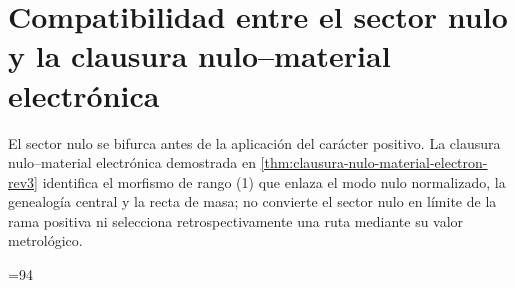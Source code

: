 

\section{Compatibilidad entre el sector nulo y la clausura nulo--material electrónica}
El sector nulo se bifurca antes de la aplicación del carácter positivo. La
clausura nulo--material electrónica demostrada en
\cref{thm:clausura-nulo-material-electron-rev3} identifica el morfismo de
rango (1) que enlaza el modo nulo normalizado, la genealogía central y la
recta de masa; no convierte el sector nulo en límite de la rama positiva ni
selecciona retrospectivamente una ruta mediante su valor metrológico.





\makeatletter
\ifHMTPartIVElectronOwnersInserted\else
  \PackageError{hmt-sucesor-102}{No se activaron los propietarios electronicos 06ka/06l}{La Parte IV no puede cerrarse sin sus cuerpos integros.}%
\fi
\ifnum\value{chapter}=94\relax
\else
  \PackageError{hmt-sucesor-102}{La Parte IV no termina en el capitulo 94}{Revise la correspondencia 56--90 a 58--92, 93 nuevo y 91 a 94.}%
\fi
\let\chapter\HMTPartIVPublicChapter
\makeatother
